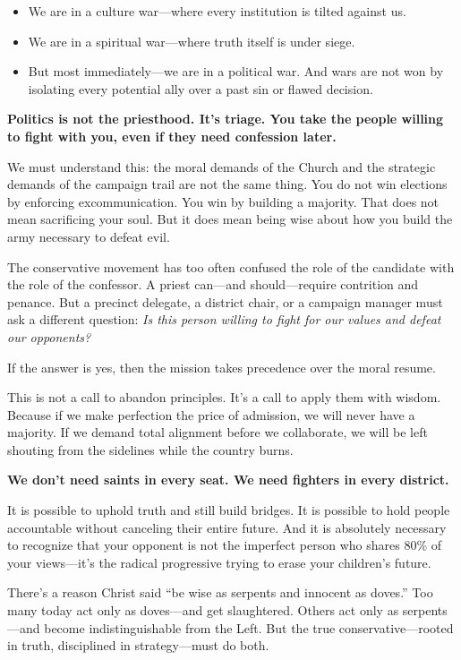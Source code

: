 \begin{itemize}
    \item We are in a culture war—where every institution is tilted against us.
    \item We are in a spiritual war—where truth itself is under siege.
    \item But most immediately—we are in a political war. And wars are not won by isolating every potential ally over a past sin or flawed decision.
\end{itemize}

\textbf{Politics is not the priesthood. It’s triage. You take the people willing to fight with you, even if they need confession later.}

We must understand this: the moral demands of the Church and the strategic demands of the campaign trail are not the same thing. You do not win elections by enforcing excommunication. You win by building a majority. That does not mean sacrificing your soul. But it does mean being wise about how you build the army necessary to defeat evil.

The conservative movement has too often confused the role of the candidate with the role of the confessor. A priest can—and should—require contrition and penance. But a precinct delegate, a district chair, or a campaign manager must ask a different question: \textit{Is this person willing to fight for our values and defeat our opponents?}

If the answer is yes, then the mission takes precedence over the moral resume.

This is not a call to abandon principles. It’s a call to apply them with wisdom. Because if we make perfection the price of admission, we will never have a majority. If we demand total alignment before we collaborate, we will be left shouting from the sidelines while the country burns.

\textbf{We don’t need saints in every seat. We need fighters in every district.}

It is possible to uphold truth and still build bridges. It is possible to hold people accountable without canceling their entire future. And it is absolutely necessary to recognize that your opponent is not the imperfect person who shares 80\% of your views—it’s the radical progressive trying to erase your children’s future.

There’s a reason Christ said “be wise as serpents and innocent as doves.” Too many today act only as doves—and get slaughtered. Others act only as serpents—and become indistinguishable from the Left. But the true conservative—rooted in truth, disciplined in strategy—must do both. 

